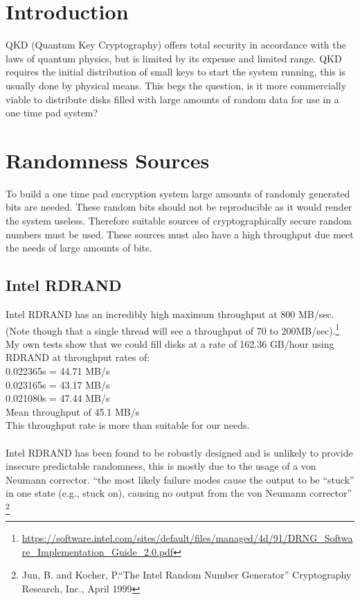 \documentclass{paper}
\begin{document}
	\maketitle
	\section{Introduction}
		QKD (Quantum Key Cryptography) offers total security in accordance with the laws of quantum physics, but is limited by its expense and limited range. QKD requires the initial distribution of small keys to start the system running, this is usually done by physical means. This begs the question, is it more commercially viable to distribute disks filled with large amounts of random data for use in a one time pad system? \\
		
	
	\section{Randomness Sources}
		To build a one time pad encryption system large amounts of randomly generated bits are needed. These random bits should not be reproducible as it would render the system useless. Therefore suitable sources of cryptographically secure random numbers must be used. These sources must also have a high throughput due meet the needs of large amounts of bits.\\ 
	
		\subsection{Intel RDRAND}
			Intel RDRAND has an incredibly high maximum throughput at 800 MB/sec. (Note though that a single thread will see a throughput of 70 to 200MB/sec).\footnote{\url{https://software.intel.com/sites/default/files/managed/4d/91/DRNG_Software_Implementation_Guide_2.0.pdf}} \\
			My own tests show that we could fill disks at a rate of 162.36 GB/hour using RDRAND at throughput rates of:\\
			0.022365s = 44.71 MB/s\\
			0.023165s = 43.17 MB/s\\
			0.021080s = 47.44 MB/s\\
			Mean throughput of 45.1 MB/s\\
			This throughput rate is more than suitable for our needs.\\\\
			Intel RDRAND has been found to be robustly designed and is unlikely to provide insecure predictable randomness, this is mostly due to the usage of a von Neumann corrector. ``the most likely failure modes cause the output to be “stuck” in one state (e.g., stuck on), causing no output from the von Neumann corrector'' \footnote{Jun, B. and Kocher, P.``The Intel Random Number Generator'' Cryptography Research, Inc., April 1999}
\end{document}
